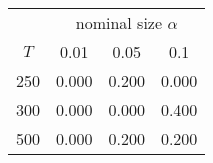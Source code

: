 % 
\begin{tabular}{cccc}
  \hline
  & \multicolumn{3}{c}{nominal size $\alpha$} \\
 $T$ & 0.01 & 0.05 & 0.1 \\
 \hline
250 & 0.000 & 0.200 & 0.000 \\ 
  300 & 0.000 & 0.000 & 0.400 \\ 
  500 & 0.000 & 0.200 & 0.200 \\ 
   \hline
\end{tabular}
